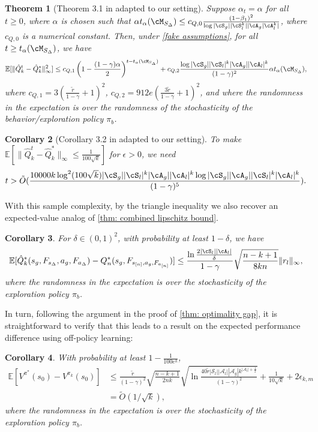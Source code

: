 \documentclass{article}
\theoremstyle{plain}
\newtheorem{theorem}{Theorem}[section]
\newtheorem{corollary}[theorem]{Corollary}
\theoremstyle{definition}
\def\E{\mathbb{E}}
\begin{document}
\begin{theorem}[Theorem 3.1 in \cite{chen2021lyapunov} adapted to our setting] Suppose $\alpha_t = \alpha$ for all $t\geq 0$, where $\alpha$ is chosen such that $\alpha t_\alpha(\cM_{S_\Delta}) \leq c_{Q,0} \frac{(1-\beta_1)^2}{\log |\cS_g||\cS_l^k| |\cA_g|\cA_l^k|}$, where $c_{Q,0}$ is a numerical constant. Then, under \cref{fake assumptions}, for all $t\geq t_\alpha(\cM_{S_\Delta})$, we have
\[\E[\|\hat{Q}^t_k - \hat{Q}_k^*\|^2_\infty] \leq c_{Q,1}\left(1 - \frac{(1-\gamma)\alpha}{2}\right)^{t-t_\alpha(\cM_{S_\Delta})} + c_{Q,2} \frac{\log |\cS_g||\cS_l|^k|\cA_g||\cA_l|^k}{(1-\gamma)^2}\alpha t_\alpha(\cM_{S_\Delta}),\]
    where $c_{Q,1} = 3(\frac{\tilde{r}}{1-\gamma} + 1)^2$, $c_{Q,2} = 912e(\frac{3\tilde{r}}{1-\gamma} + 1)^2$, and where the randomness in the expectation is over the randomness of the stochasticity of the behavior/exploration policy $\pi_b$.
\end{theorem}
\begin{corollary}[Corollary 3.2 in \cite{chen2021lyapunov} adapted to our setting] To make $\E[\|\hat{Q}_k^t - \hat{Q}_k^*\|_\infty \leq \frac{1}{100\sqrt{k}}]$ for $\epsilon>0$, we need \[t>\tilde{O}(\frac{10000 k \log^2(100\sqrt{k})|\cS_g||\cS_l|^k|\cA_g||\cA_l|^k\log |\cS_g||\cA_g||\cS_l|^k|\cA_l|^k}{(1-\gamma)^5}).\]    
\end{corollary}
With this sample complexity, by the triangle inequality we also recover an expected-value analog of \cref{thm: combined lipschitz bound}.
\begin{corollary}For $\delta\in(0,1)^2$, with probability at least $1-\delta$, we have
    \[\E[\hat{Q}_k^*(s_g,F_{s_\Delta},a_g,F_{a_\Delta}) - Q_n^*(s_g,F_{s_{[n]},a_g,F_{a_{[n]}}})] \leq \frac{\ln \frac{2|\cS_l||\cA_l|}{\delta}}{1-\gamma}\sqrt{\frac{n-k+1}{8kn}}\|r_l\|_\infty,\]
    where the randomness in the expectation is over the stochasticity of the exploration policy $\pi_b$.
\end{corollary}
In turn, following the argument in the proof of \cref{thm: optimality gap}, it is straightforward to verify that this leads to a result on the expected performance difference using off-policy learning:
\begin{corollary}\label{offpolicy-result} With probability at least $1 - \frac{1}{100e^k}$,
\begin{align*}\E[V^{\pi^*}(s_0) - V^{\pi_{k}}(s_0)] &\leq \frac{\tilde{r}}{(1-\gamma)^2}\sqrt{\frac{n-k+1}{2nk}} \sqrt{\ln\frac{40\tilde{r}|\mathcal{S}_l||\mathcal{A}_l||\mathcal{A}_g|k^{|\mathcal{A}_l|+\frac{1}{2}}}{(1-\gamma)^2}}  + \frac{1}{10\sqrt{k}} + 2\epsilon_{k,m} \\
&= \tilde{O}(1/\sqrt{k}),\end{align*}
where the randomness in the expectation is over the stochasticity of the exploration policy $\pi_b$.
\end{corollary}
\end{document}
